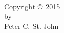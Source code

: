 \chapter*{}
\null
\vfill
\begin{center}
  \thetitle\\[2ex]
  Copyright \copyright \ 2015\\
  by\\
  Peter C. St. John
\end{center}
